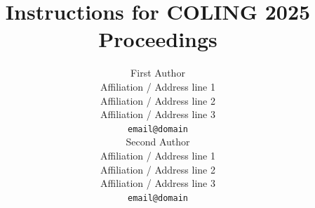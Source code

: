\documentclass{article}
\begin{document}
\title{Instructions for COLING 2025 Proceedings}


\author{First Author \\
  Affiliation / Address line 1 \\
  Affiliation / Address line 2 \\
  Affiliation / Address line 3 \\
  \texttt{email@domain} \\\And
  Second Author \\
  Affiliation / Address line 1 \\
  Affiliation / Address line 2 \\
  Affiliation / Address line 3 \\
  \texttt{email@domain} \\}
\end{document}
